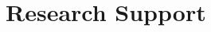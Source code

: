 \documentclass{nihbiosketch}
\begin{document}












\section{Research Support}
\end{document}
